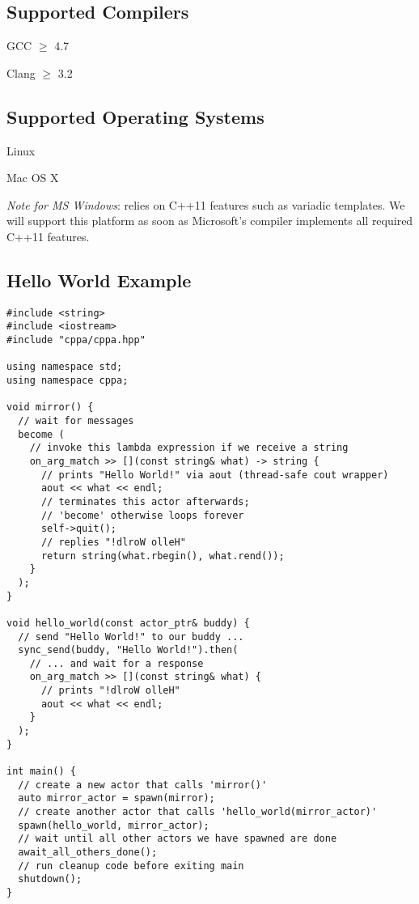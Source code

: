 \subsection{Supported Compilers}

\begin{itemize*}
  \item GCC $\ge$ 4.7
  \item Clang $\ge$ 3.2
\end{itemize*}

\subsection{Supported Operating Systems}

\begin{itemize*}
\item Linux
\item Mac OS X
\item \textit{Note for MS Windows}:
\libcppa relies on C++11 features such as variadic templates.
We will support this platform as soon as Microsoft's compiler implements all required C++11 features.
\end{itemize*}

\clearpage
\subsection{Hello World Example}

\begin{lstlisting}
#include <string>
#include <iostream>
#include "cppa/cppa.hpp"

using namespace std;
using namespace cppa;

void mirror() {
  // wait for messages
  become (
    // invoke this lambda expression if we receive a string
    on_arg_match >> [](const string& what) -> string {
      // prints "Hello World!" via aout (thread-safe cout wrapper)
      aout << what << endl;
      // terminates this actor afterwards;
      // 'become' otherwise loops forever
      self->quit();
      // replies "!dlroW olleH"
      return string(what.rbegin(), what.rend());
    }
  );
}

void hello_world(const actor_ptr& buddy) {
  // send "Hello World!" to our buddy ...
  sync_send(buddy, "Hello World!").then(
    // ... and wait for a response
    on_arg_match >> [](const string& what) {
      // prints "!dlroW olleH"
      aout << what << endl;
    }
  );
}

int main() {
  // create a new actor that calls 'mirror()'
  auto mirror_actor = spawn(mirror);
  // create another actor that calls 'hello_world(mirror_actor)'
  spawn(hello_world, mirror_actor);
  // wait until all other actors we have spawned are done
  await_all_others_done();
  // run cleanup code before exiting main
  shutdown();
}
\end{lstlisting}
